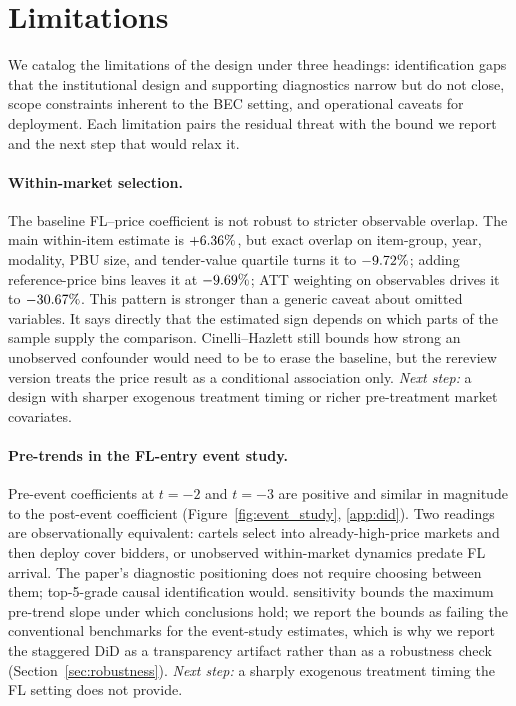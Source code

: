 \section{Limitations}
\label{sec:limitations}

We catalog the limitations of the design under three headings:
identification gaps that the institutional design and supporting
diagnostics narrow but do not close, scope constraints inherent to
the BEC setting, and operational caveats for deployment. Each
limitation pairs the residual threat with the bound we report and
the next step that would relax it.

\paragraph{Within-market selection.}
The baseline FL--price coefficient is not robust to stricter
observable overlap. The main within-item estimate is
$+6.36\%$, but exact overlap on item-group, year,
modality, PBU size, and tender-value quartile turns it to
$-9.72\%$; adding reference-price bins leaves it at
$-9.69\%$; ATT weighting on observables drives it
to $-30.67\%$. This pattern is stronger than a generic
caveat about omitted variables. It says directly that the
estimated sign depends on which parts of the sample supply the
comparison. Cinelli--Hazlett still bounds how strong an
unobserved confounder would need to be to erase the baseline,
but the rereview version treats the price result as a
conditional association only. \emph{Next step:} a design with
sharper exogenous treatment timing or richer pre-treatment
market covariates.

\paragraph{Pre-trends in the FL-entry event study.}
Pre-event coefficients at $t = -2$ and $t = -3$ are positive and
similar in magnitude to the post-event coefficient
(Figure~\ref{fig:event_study}, \ref{app:did}). Two readings are
observationally equivalent: cartels select into already-high-price
markets and then deploy cover bidders, or unobserved
within-market dynamics predate FL arrival. The paper's
diagnostic positioning does not require choosing between them;
top-5-grade causal identification would.
\citet{rambachan2023more} sensitivity bounds the maximum
pre-trend slope under which conclusions hold; we report the
bounds as failing the conventional benchmarks for the
event-study estimates, which is why we report the staggered DiD
as a transparency artifact rather than as a robustness check
(Section~\ref{sec:robustness}). \emph{Next step:} a sharply
exogenous treatment timing the FL setting does not provide.

